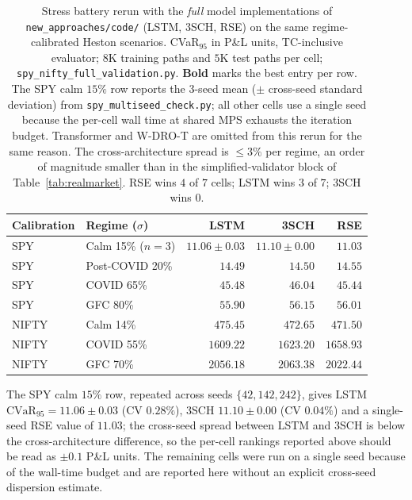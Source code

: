 \documentclass[10pt,letterpaper]{article}
\newcommand{\cvar}{\mathrm{CVaR}}
\begin{document}
\begin{table}[ht]
\centering\small
\caption{Stress battery rerun with the \emph{full} model
implementations of \texttt{new\_approaches/code/} (LSTM, 3SCH, RSE)
on the same regime-calibrated Heston scenarios. CVaR$_{95}$ in
P\&L units, TC-inclusive evaluator; $8$K training paths and $5$K
test paths per cell; \texttt{spy\_nifty\_full\_validation.py}.
\textbf{Bold} marks the best entry per row. The SPY calm $15\%$
row reports the $3$-seed mean ($\pm$ cross-seed standard deviation)
from \texttt{spy\_multiseed\_check.py}; all other cells use a
single seed because the per-cell wall time at shared MPS exhausts
the iteration budget. Transformer and W-DRO-T are omitted from
this rerun for the same reason. The cross-architecture spread is
$\le 3\%$ per regime, an order of magnitude smaller than in the
simplified-validator block of Table~\ref{tab:realmarket}. RSE wins
$4$ of $7$ cells; LSTM wins $3$ of $7$; 3SCH wins $0$.}
\label{tab:realmarket_full}
\begin{tabular}{@{}llrrr@{}}
\toprule
\textbf{Calibration} & \textbf{Regime ($\sigma$)} & \textbf{LSTM} & \textbf{3SCH} & \textbf{RSE} \\\midrule
SPY    & Calm 15\% ($n\!=\!3$) & $11.06\pm 0.03$ & $11.10\pm 0.00$ & $\mathbf{11.03}$ \\
SPY    & Post-COVID 20\% & $\mathbf{14.49}$  & $14.50$  & $14.55$  \\
SPY    & COVID 65\%      & $45.48$  & $46.04$  & $\mathbf{45.44}$ \\
SPY    & GFC 80\%        & $\mathbf{55.90}$  & $56.15$  & $56.01$ \\
NIFTY  & Calm 14\%       & $475.45$ & $472.65$ & $\mathbf{471.50}$ \\
NIFTY  & COVID 55\%      & $\mathbf{1609.22}$ & $1623.20$ & $1658.93$ \\
NIFTY  & GFC 70\%        & $2056.18$ & $2063.38$ & $\mathbf{2022.44}$ \\
\bottomrule
\end{tabular}
\end{table}

The SPY calm $15\%$ row, repeated across seeds $\{42,142,242\}$,
gives LSTM $\cvar_{95}=11.06\pm 0.03$ (CV $0.28\%$), 3SCH
$11.10\pm 0.00$ (CV $0.04\%$) and a single-seed RSE value of
$11.03$; the cross-seed spread between LSTM and 3SCH is below the
cross-architecture difference, so the per-cell rankings reported
above should be read as $\pm 0.1$ P\&L units. The remaining cells
were run on a single seed because of the wall-time budget and are
reported here without an explicit cross-seed dispersion estimate.
\end{document}
